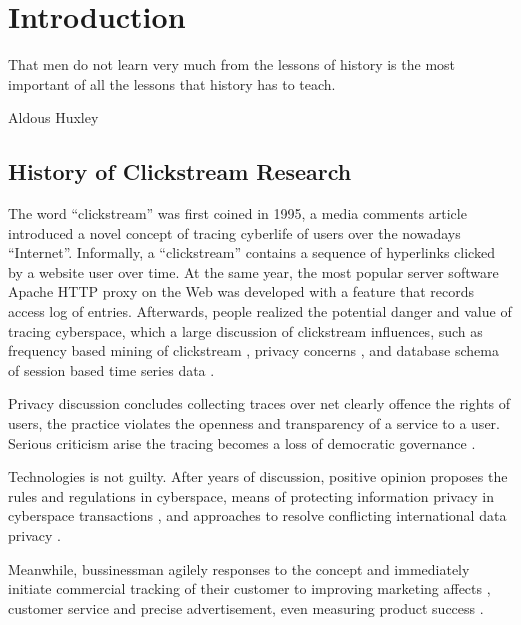 \section{Introduction}
\label{ch:intro}

\epigraph{That men do not learn very much from the lessons of history is the most important of all the lessons that history has to teach.}{Aldous Huxley}

\subsection{History of Clickstream Research}


The word ``clickstream'' \cite{friedman1995} was first coined in 1995, a media comments 
article introduced a novel concept of tracing cyberlife of users over the nowadays 
``Internet''. Informally, a ``clickstream'' contains a sequence of hyperlinks clicked by a 
website user over time. At the same year, the most popular server software 
Apache HTTP \cite{apache1995http} proxy on the Web was developed with a feature that 
records access log of entries. Afterwards, people realized the potential danger and value 
of tracing cyberspace, which a large discussion of clickstream influences, such as 
frequency based mining of clickstream \cite{brodwin1995}, privacy concerns 
\cite{reidenberg1996governing}, and database schema of session based time series data 
\cite{courtheoux2000database}.


Privacy discussion concludes collecting traces over net clearly offence the rights of users,
the practice violates the openness and transparency of a service to a user.
Serious criticism arise the tracing becomes a loss of democratic governance \cite{gindin1997lost}.

Technologies is not guilty. After years of discussion, positive opinion proposes the rules 
\cite{reidenberg1996governing} and regulations \cite{skok1999establishing} in cyberspace,
means of protecting information privacy in cyberspace transactions \cite{kang1997information},
and approaches to resolve conflicting international data privacy \cite{reidenberg1999resolving}.

Meanwhile, bussinessman agilely responses to the concept and immediately initiate 
commercial tracking of their customer to improving marketing affects \cite{novick1995}, 
customer service and precise advertisement\cite{reagle1999platform, bucklin2000sticky}, 
even measuring product success \cite{schonberg2000measuring}.

